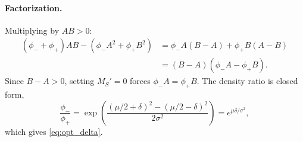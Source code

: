 \documentclass[11pt]{article}
\begin{document}
\paragraph{Factorization.}
Multiplying by $AB>0$:
\begin{align}
(\phi_-+\phi_+)AB-\left(\phi_-A^2+\phi_+B^2\right)
&=\phi_-A(B-A)+\phi_+B(A-B) \nonumber\\
&=(B-A)\left(\phi_-A-\phi_+B\right).
\end{align}
Since $B-A>0$, setting $M_S'=0$ forces $\phi_-A=\phi_+B$. The density ratio is closed form,
\begin{equation}
\frac{\phi_-}{\phi_+}=\exp\!\left(\frac{(\mu/2+\delta)^2-(\mu/2-\delta)^2}{2\sigma^2}\right)
=e^{\mu\delta/\sigma^2},
\end{equation}
which gives \eqref{eq:opt_delta}.
\end{document}
